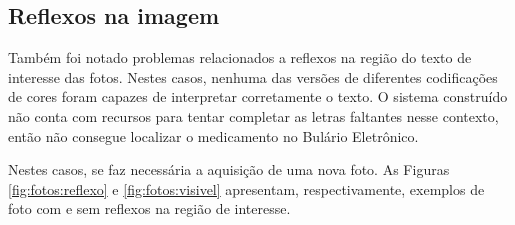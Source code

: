 \subsection{Reflexos na imagem}

Também foi notado problemas relacionados a reflexos na região do texto de interesse das fotos.
Nestes casos, nenhuma das versões de diferentes codificações de cores foram capazes de interpretar corretamente o texto.
O sistema construído não conta com recursos para tentar completar as letras faltantes nesse contexto, então não consegue localizar o medicamento no Bulário Eletrônico.

Nestes casos, se faz necessária a aquisição de uma nova foto.
As Figuras \ref{fig:fotos:reflexo} e \ref{fig:fotos:visivel} apresentam, respectivamente, exemplos de foto com e sem reflexos na região de interesse.

